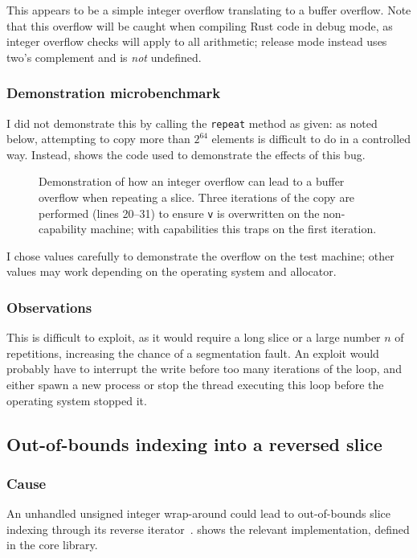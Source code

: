 \documentclass[dissertation.tex]{subfiles}
\begin{document}
This appears to be a simple integer overflow translating to a buffer
overflow.
Note that this overflow will be caught when compiling Rust code in debug
mode, as integer overflow checks will apply to all arithmetic; release
mode instead uses two's complement and is \emph{not} undefined.

\subsubsection{Demonstration microbenchmark}
I did not demonstrate this by calling the \texttt{repeat} method as
given: as noted below, attempting to copy more than \(2^{64}\) elements
is difficult to do in a controlled way.
Instead,  shows the code used to demonstrate the
effects of this bug.

\begin{figure}[ht]
    
    \caption{
        Demonstration of how an integer overflow can lead to a buffer
        overflow when repeating a slice.
        Three iterations of the copy are performed (lines 20--31) to
        ensure \texttt{v} is overwritten on the non-capability machine;
        with capabilities this traps on the first iteration.
    }
    \label{lst:micro-repeat}
\end{figure}

I chose values carefully to demonstrate the overflow on the test
machine; other values may work depending on the operating system and
allocator.

\subsubsection{Observations}
This is difficult to exploit, as it would require a long slice or a
large number \(n\) of repetitions, increasing the chance of a
segmentation fault.
An exploit would probably have to interrupt the write before too many
iterations of the loop, and either spawn a new process or stop the
thread executing this loop before the operating system stopped it.


\subsection{Out-of-bounds indexing into a reversed slice}

\subsubsection{Cause}
An unhandled unsigned integer wrap-around could lead to out-of-bounds
slice indexing through its reverse iterator~\cite{rust-pr-reverse}.
 shows the relevant implementation, defined in the
core library.
\end{document}
